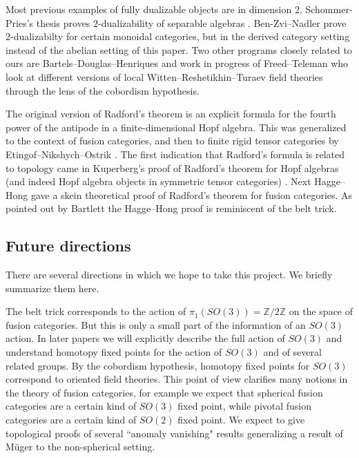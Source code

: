 \documentclass{amsart}
\begin{document}
Most previous examples of fully dualizable objects are in dimension $2$.  Schommer-Pries's thesis proves $2$-dualizability of separable algebras \cite{schommer-pries-thesis}.    Ben-Zvi--Nadler \cite{0904.1247} prove $2$-dualizabilty for certain monoidal categories, but in the derived category setting instead of the abelian setting of this paper.   Two other programs closely related to ours are Bartels--Douglas--Henriques \cite{0912.5307} and work in progress of Freed--Teleman who look at different versions of local Witten--Reshetikhin--Turaev field theories \cite{MR990772, MR1091619} through the lens of the cobordism hypothesis. 

The original version of Radford's theorem \cite{MR0407069} is an explicit formula for the fourth power of the antipode in a finite-dimensional Hopf algebra.  This was generalized to the context of fusion categories, and then to finite rigid tensor categories by Etingof--Nikshych--Ostrik \cite{MR2183279,MR2097289}.  The first indication that Radford's formula is related to topology came in Kuperberg's proof of Radford's theorem for Hopf algebras (and indeed Hopf algebra objects in symmetric tensor categories) \cite{MR1394749}.  Next Hagge--Hong \cite{MR2559711} gave a skein theoretical proof of Radford's theorem for fusion categories.  As pointed out by Bartlett \cite{0901.3975} the Hagge--Hong proof is reminiscent of the belt trick.

\subsection*{Future directions}

There are several directions in which we hope to take this project. We briefly summarize them here.

The belt trick corresponds to the action of $\pi_1(SO(3)) = \mathbb{Z}/2\mathbb{Z}$ on the space of fusion categories.  But this is only a small part of the information of an $SO(3)$ action.  In later papers we will explicitly describe the full action of $SO(3)$ and understand homotopy fixed points for the action of $SO(3)$ and of several related groups.  By the cobordism hypothesis, homotopy fixed points for $SO(3)$ correspond to oriented field theories.  This point of view clarifies many notions in the theory of fusion categories, for example we expect that spherical fusion categories are a certain kind of $SO(3)$ fixed point, while pivotal fusion categories are a certain kind of $SO(2)$ fixed point.  We expect to give topological proofs of several ``anomaly vanishing" results generalizing a result of M\"uger \cite{MR1966525} to the non-spherical setting.
\end{document}
